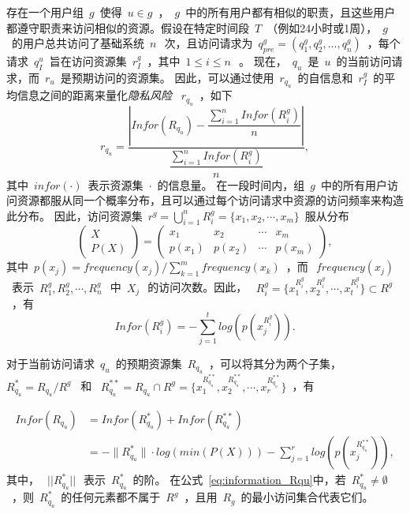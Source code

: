 存在一个用户组~$g$~使得~$u \in g$~，~$g$~中的所有用户都有相似的职责，且这些用户都遵守职责来访问相似的资源。假设在特定时间段~$T$~（例如24小时或1周），~$g$~的用户总共访问了基础系统~$n~$~次，且访问请求为~$q^g_{pre}=(q^g_1,q^g_2,...,q^g_n)$~，每个请求~$q^u_I$~旨在访问资源集~$r^g_I$~，其中~$1 \leq i \leq n~$~。
现在，~$q_u$~是~$u$~的当前访问请求，而~$r_u$~是预期访问的资源集。 因此，可以通过使用~$r_{q_u}$~的自信息和~$r^g_I$~的平均信息之间的距离来量化\emph{隐私风险} ~$r_{q_u}$~，如下
\begin{equation}\label{eq:privacy_risk_qu}
r_{q_u} = \dfrac{|Infor(R_{q_u})-\dfrac{\sum ^{n}_{i=1} Infor(R^g_i)}{n}|}{\dfrac{\sum ^{n}_{i=1} Infor(R^g_i)}{n}}, 
\end{equation}
其中~$infor(\cdot)$~表示资源集~$\cdot$~的信息量。 在一段时间内，组~$g$~中的所有用户访问资源都服从同一个概率分布，且可以通过每个访问请求中资源的访问频率来构造此分布。 因此，访问资源集~$r^g = \bigcup _{i=1}^n R^g_i=\{x_1, x_2, \cdots, x_m\}$~服从分布
\begin{equation}\label{eq:distribution_Rg}
\left(
\begin{array}{c}
X \\ P(X)
\end{array}
\right)
=\left(
\begin{array}{cccccccccc}
x_1 &  x_2 & \cdots & x_m
\\ p(x_1) &  p(x_2) & \cdots & p(x_m)
\end{array}
\right),
\end{equation}
其中~$p(x_j)=frequency(x_j)/\sum_{k=1}^m frequency(x_k)$~，而~$~frequency(x_j)$~表示~$R^g_1, R^g_2, \cdots, R^g_n~$~中~$X_j~$~的访问次数。因此， ~$R^g_i =\{x_1^{R^g_i},x_2^{R^g_i},\cdots, x_t^{R^g_i}\} \subset R^g$~，有
\begin{equation}\label{eq:information_Rgi}
Infor(R^g_i)=-\sum_{j=1}^t log(p(x_j^{R^g_i})).
\end{equation}

对于当前访问请求~$q_u$~的预期资源集~$R_{q_u}$~，可以将其分为两个子集， ~$R_{q_u}^* = R_{q_u}/R^g$~ 和 ~$R_{q_u}^{**} = R_{q_u} \cap R^g = \{x_1^{R_{q_u}^{**}},x_2^{R_{q_u}^{**}},\cdots, x_r^{R_{q_u}^{**}}\}$~，有

\begin{equation}\label{eq:information_Rqu}
\begin{split}
Infor(R_{q_u})&=Infor(R_{q_u}^{*})  +Infor(R_{q_u}^{**})
\\&=-\|R_{q_u}^*\|\cdot log(min(P(X)))-\sum_{j=1}^r log(p(x_j^{R_{q_u}^{**}})),
\end{split}
\end{equation}
其中，~$~||R_{q_u}^*||~$~表示~$R_{q_u}^*$~的阶。 在公式~\ref{eq:information_Rqu}中，若~$R_{q_u}^* \neq \emptyset$~，则~$R_{q_u}^*$~的任何元素都不属于~$R^g$~，且用~$R_g$~的最小访问集合代表它们。

